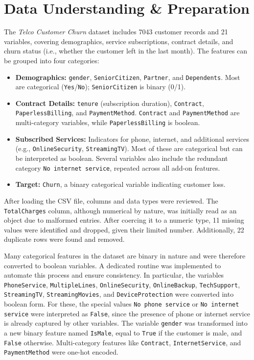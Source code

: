 \documentclass[a4paper,11pt]{article}
\begin{document}
\section{Data Understanding \& Preparation}
The \textit{Telco Customer Churn} dataset includes 7043 customer records and 21 variables, covering demographics, service subscriptions, contract details, and churn status (i.e., whether the customer left in the last month). The features can be grouped into four categories:

\begin{itemize}
\item \textbf{Demographics:} \texttt{gender}, \texttt{SeniorCitizen}, \texttt{Partner}, and \texttt{Dependents}. Most are categorical (\texttt{Yes}/\texttt{No}); \texttt{SeniorCitizen} is binary (0/1).
\sloppy
\item \textbf{Contract Details:} \texttt{tenure} (subscription duration), \texttt{Contract}, \texttt{PaperlessBilling}, and \texttt{PaymentMethod}. \texttt{Contract} and \texttt{PaymentMethod} are multi-category variables, while \texttt{PaperlessBilling} is boolean.

\item \textbf{Subscribed Services:} Indicators for phone, internet, and additional services (e.g., \texttt{OnlineSecurity}, \texttt{StreamingTV}). Most of these are categorical but can be interpreted as boolean. Several variables also include the redundant category \texttt{No internet service}, repeated across all add-on features.

\item \textbf{Target:} \texttt{Churn}, a binary categorical variable indicating customer loss.
\end{itemize}

After loading the CSV file, columns and data types were reviewed. The \texttt{TotalCharges} column, although numerical by nature, was initially read as an object due to malformed entries. After coercing it to a numeric type, 11 missing values were identified and dropped, given their limited number. Additionally, 22 duplicate rows were found and removed.

Many categorical features in the dataset are binary in nature and were therefore converted to boolean variables. A dedicated routine was implemented to automate this process and ensure consistency. In particular, the variables \texttt{PhoneService}, \texttt{MultipleLines}, \texttt{OnlineSecurity}, \texttt{OnlineBackup}, \texttt{TechSupport}, \texttt{StreamingTV}, \texttt{StreamingMovies}, and \texttt{DeviceProtection} were converted into boolean form. For these, the special values \texttt{No phone service} or \texttt{No internet service} were interpreted as \texttt{False}, since the presence of phone or internet service is already captured by other variables. The variable \texttt{gender} was transformed into a new binary feature named \texttt{IsMale}, equal to \texttt{True} if the customer is male, and \texttt{False} otherwise. Multi-category features like \texttt{Contract}, \texttt{InternetService}, and \texttt{PaymentMethod} were one-hot encoded.
\end{document}
